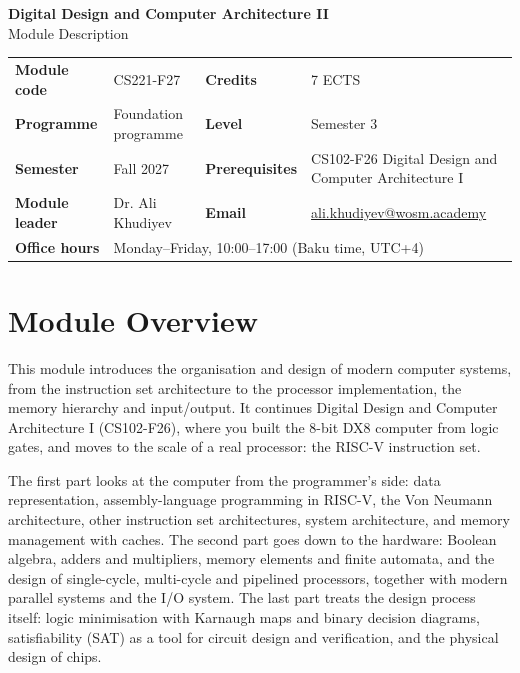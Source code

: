 \documentclass[11pt,a4paper]{article}
\makeatletter
\newcommand{\ModuleTitle}{Digital Design and Computer Architecture II}
\newcommand{\ModuleCode}{CS221-F27}
\newcommand{\Programme}{Foundation programme}
\newcommand{\Level}{Semester 3}
\newcommand{\Semester}{Fall 2027}
\newcommand{\Credits}{7 ECTS}
\newcommand{\ModuleLeader}{Dr. Ali Khudiyev}
\newcommand{\Email}{ali.khudiyev@wosm.academy}
\newcommand{\OfficeHours}{Monday--Friday, 10:00--17:00 (Baku time, UTC+4)}
\newcommand{\Prerequisites}{CS102-F26 Digital Design and Computer Architecture I}
\makeatother
\begin{document}
\begin{center}
  {\LARGE\bfseries\color{accent} \ModuleTitle}\\[4pt]
  {\large Module Description}
\end{center}
\vspace{6pt}

\begin{tabularx}{\textwidth}{>{\bfseries}l X >{\bfseries}l X}
\toprule
Module code   & \ModuleCode    & Credits      & \Credits \\
Programme     & \Programme     & Level        & \Level \\
Semester      & \Semester      & Prerequisites & \Prerequisites \\
Module leader & \ModuleLeader  & Email        & \href{mailto:\Email}{\Email} \\
Office hours  & \multicolumn{3}{l}{\OfficeHours} \\
\bottomrule
\end{tabularx}

\section{Module Overview}
This module introduces the organisation and design of modern computer systems,
from the instruction set architecture to the processor implementation, the memory
hierarchy and input/output. It continues Digital Design and Computer Architecture I
(CS102-F26), where you built the 8-bit DX8 computer from logic gates, and moves to
the scale of a real processor: the RISC-V instruction set.

The first part looks at the computer from the programmer's side: data
representation, assembly-language programming in RISC-V, the Von Neumann
architecture, other instruction set architectures, system architecture, and memory
management with caches. The second part goes down to the hardware: Boolean algebra,
adders and multipliers, memory elements and finite automata, and the design of
single-cycle, multi-cycle and pipelined processors, together with modern parallel
systems and the I/O system. The last part treats the design process itself: logic
minimisation with Karnaugh maps and binary decision diagrams, satisfiability (SAT)
as a tool for circuit design and verification, and the physical design of chips.
\end{document}
